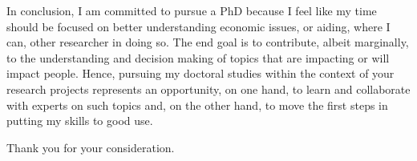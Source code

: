\documentclass{letter}
\begin{document}
\begin{letter}{}
    In conclusion, I am committed to pursue a PhD because I feel like my time should be focused on better understanding economic issues, or aiding, where I can, other researcher in doing so. The end goal is to contribute, albeit marginally, to the understanding and decision making of topics that are impacting or will impact people. Hence, pursuing my doctoral studies within the context of your research projects represents an opportunity, on one hand, to learn and collaborate with experts on such topics and, on the other hand, to move the first steps in putting my skills to good use.

    \closing{Thank you for your consideration.}

\end{letter}
\end{document}
